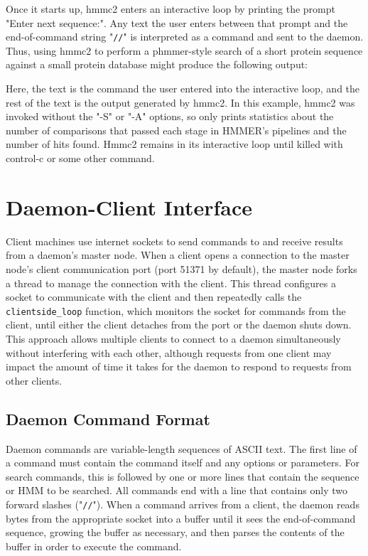 \documentclass[notoc,justified]{tufte-book}    %
\begin{document}
Once it starts up, hmmc2 enters an interactive loop by printing the prompt "Enter next sequence:".  Any text the user enters between that prompt and the end-of-command string "{\tt //}" is interpreted as a command and sent to the daemon.  Thus, using hmmc2 to perform a phmmer-style search of a short protein sequence against a small protein database might produce the following output:

 \vspace{-1ex}
 \vspace{-1ex}

Here, the text
  \vspace{1ex}
  \user{//}
  \vspace{1ex}
is the command the user entered into the interactive loop, and the rest of the text is the output generated by hmmc2.  In this example, hmmc2 was invoked without the "-S" or "-A" options, so only prints statistics about the number of comparisons that passed each stage in HMMER's pipelines and the number of hits found.  Hmmc2 remains in its interactive loop until killed with control-c or some other command.

\chapter{Daemon-Client Interface}
Client machines use internet sockets to send commands to and receive results from a daemon's master node.  When a client opens a connection to the master node's client communication port (port 51371 by default), the master node forks a thread to manage the connection with the client.  This thread configures a socket to communicate with the client and then repeatedly calls the {\tt clientside\_loop} function, which monitors the socket for commands from the client, until either the client detaches from the port or the daemon shuts down.  This approach allows multiple clients to connect to a daemon simultaneously without interfering with each other, although requests from one client may impact the amount of time it takes for the daemon to respond to requests from other clients.


\section{Daemon Command Format}
Daemon commands are variable-length sequences of ASCII text.  The first line of a command must contain the command itself and any options or parameters.  For search commands, this is followed by one or more lines that contain the sequence or HMM to be searched.  All commands end with a line that contains only two forward slashes ("{\tt //}").  When a command arrives from a client, the daemon reads bytes from the appropriate socket into a buffer until it sees the end-of-command sequence, growing the buffer as necessary, and then parses the contents of the buffer in order to execute the command.   
\end{document}
